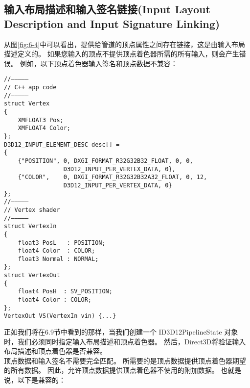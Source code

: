 \subsection{输入布局描述和输入签名链接(Input Layout Description and Input Signature Linking)}
\begin{flushleft}
从图\ref{fig:6-4}中可以看出，提供给管道的顶点属性之间存在链接，这是由输入布局描述定义的。 如果您输入的顶点不提供顶点着色器所需的所有输入，则会产生错误。 例如，以下顶点着色器输入签名和顶点数据不兼容：\\
\end{flushleft}
\begin{lstlisting}
//––––—
// C++ app code
//––––—
struct Vertex
{
    XMFLOAT3 Pos;
    XMFLOAT4 Color;
};
D3D12_INPUT_ELEMENT_DESC desc[] =
{
    {"POSITION", 0, DXGI_FORMAT_R32G32B32_FLOAT, 0, 0,
                 D3D12_INPUT_PER_VERTEX_DATA, 0},
    {"COLOR",    0, DXGI_FORMAT_R32G32B32A32_FLOAT, 0, 12,
                 D3D12_INPUT_PER_VERTEX_DATA, 0}
};
//––––—
// Vertex shader
//––––—
struct VertexIn
{
    float3 PosL   : POSITION;
    float4 Color  : COLOR;
    float3 Normal : NORMAL;
};
struct VertexOut
{
    float4 PosH  : SV_POSITION;
    float4 Color : COLOR;
};
VertexOut VS(VertexIn vin) {...}
\end{lstlisting}

\begin{flushleft}
正如我们将在6.9节中看到的那样，当我们创建一个 ID3D12PipelineState 对象时，我们必须同时指定输入布局描述和顶点着色器。 然后，Direct3D将验证输入布局描述和顶点着色器是否兼容。\\
顶点数据和输入签名不需要完全匹配。 所需要的是顶点数据提供顶点着色器期望的所有数据。 因此，允许顶点数据提供顶点着色器不使用的附加数据。 也就是说，以下是兼容的：
\end{flushleft}

